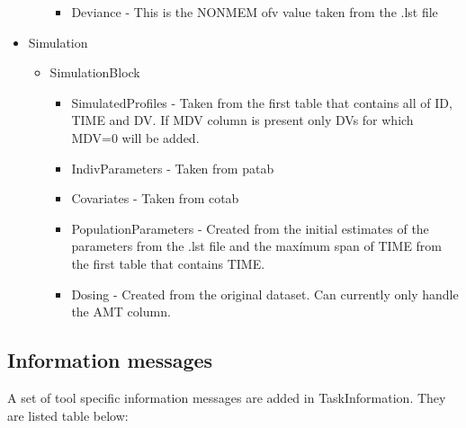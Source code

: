 \begin{itemize}
\begin{itemize}
\begin{itemize}
                    \item Deviance - This is the NONMEM ofv value taken from the .lst file
                \end{itemize}
        \end{itemize}
    \item Simulation 
        \begin{itemize}
            \item SimulationBlock    
            \begin{itemize}
                \item SimulatedProfiles - Taken from the first table that contains all of ID, TIME and DV. If MDV column is present only DVs for which MDV=0 will be added.
                \item IndivParameters - Taken from patab
                \item Covariates - Taken from cotab
                \item PopulationParameters - Created from the initial estimates of the parameters from the .lst file and the maxímum span of TIME from the first table that contains TIME.
                \item Dosing - Created from the original dataset. Can currently only handle the AMT column.
            \end{itemize}
        \end{itemize}
\end{itemize}

\subsection{Information messages}
A set of tool specific information messages are added in TaskInformation. They are listed table below:

